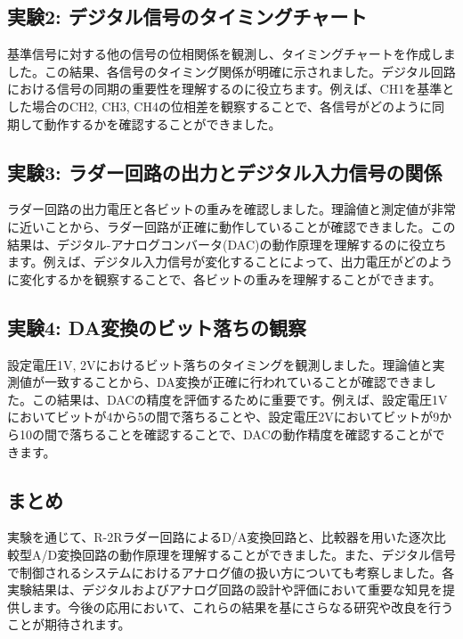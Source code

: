\documentclass[a4paper,11pt,xelatex,ja=standard]{bxjsarticle}
\begin{document}
    \subsection{実験2: デジタル信号のタイミングチャート}
        基準信号に対する他の信号の位相関係を観測し、タイミングチャートを作成しました。この結果、各信号のタイミング関係が明確に示されました。デジタル回路における信号の同期の重要性を理解するのに役立ちます。例えば、CH1を基準とした場合のCH2, CH3, CH4の位相差を観察することで、各信号がどのように同期して動作するかを確認することができました。

    \subsection{実験3: ラダー回路の出力とデジタル入力信号の関係}
        ラダー回路の出力電圧と各ビットの重みを確認しました。理論値と測定値が非常に近いことから、ラダー回路が正確に動作していることが確認できました。この結果は、デジタル-アナログコンバータ(DAC)の動作原理を理解するのに役立ちます。例えば、デジタル入力信号が変化することによって、出力電圧がどのように変化するかを観察することで、各ビットの重みを理解することができます。

    \subsection{実験4: DA変換のビット落ちの観察}
        設定電圧1V, 2Vにおけるビット落ちのタイミングを観測しました。理論値と実測値が一致することから、DA変換が正確に行われていることが確認できました。この結果は、DACの精度を評価するために重要です。例えば、設定電圧1Vにおいてビットが4から5の間で落ちることや、設定電圧2Vにおいてビットが9から10の間で落ちることを確認することで、DACの動作精度を確認することができます。

    \subsection{まとめ}
        実験を通じて、R-2Rラダー回路によるD/A変換回路と、比較器を用いた逐次比較型A/D変換回路の動作原理を理解することができました。また、デジタル信号で制御されるシステムにおけるアナログ値の扱い方についても考察しました。各実験結果は、デジタルおよびアナログ回路の設計や評価において重要な知見を提供します。今後の応用において、これらの結果を基にさらなる研究や改良を行うことが期待されます。
\end{document}
